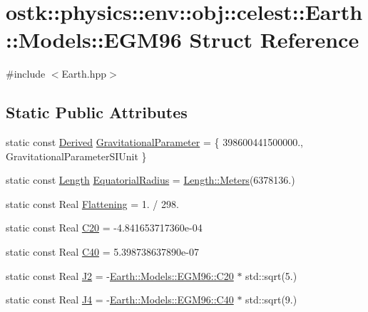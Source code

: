 \hypertarget{structostk_1_1physics_1_1env_1_1obj_1_1celest_1_1_earth_1_1_models_1_1_e_g_m96}{}\section{ostk\+:\+:physics\+:\+:env\+:\+:obj\+:\+:celest\+:\+:Earth\+:\+:Models\+:\+:E\+G\+M96 Struct Reference}
\label{structostk_1_1physics_1_1env_1_1obj_1_1celest_1_1_earth_1_1_models_1_1_e_g_m96}


{\ttfamily \#include $<$Earth.\+hpp$>$}

\subsection*{Static Public Attributes}
\begin{DoxyCompactItemize}
\item 
static const \hyperlink{classostk_1_1physics_1_1units_1_1_derived}{Derived} \hyperlink{structostk_1_1physics_1_1env_1_1obj_1_1celest_1_1_earth_1_1_models_1_1_e_g_m96_aa9bd99a13d1a3642806b5bb12238207e}{Gravitational\+Parameter} = \{ 398600441500000., Gravitational\+Parameter\+S\+I\+Unit \}
\item 
static const \hyperlink{classostk_1_1physics_1_1units_1_1_length}{Length} \hyperlink{structostk_1_1physics_1_1env_1_1obj_1_1celest_1_1_earth_1_1_models_1_1_e_g_m96_a6fd4657896411dfffa899b5d69c501c0}{Equatorial\+Radius} = \hyperlink{classostk_1_1physics_1_1units_1_1_length_ad227977ce00756791595796a0dd5ddd7}{Length\+::\+Meters}(6378136.)
\item 
static const Real \hyperlink{structostk_1_1physics_1_1env_1_1obj_1_1celest_1_1_earth_1_1_models_1_1_e_g_m96_a8e88f7d8d42fef033a94f610d6bb75f9}{Flattening} = 1. / 298.
\item 
static const Real \hyperlink{structostk_1_1physics_1_1env_1_1obj_1_1celest_1_1_earth_1_1_models_1_1_e_g_m96_a9ae4801d69fc8be4dcb24bc7496ff5b7}{C20} = -\/4.\+841653717360e-\/04
\item 
static const Real \hyperlink{structostk_1_1physics_1_1env_1_1obj_1_1celest_1_1_earth_1_1_models_1_1_e_g_m96_a0d1ffd77c12b97cfd85ce1b2970e5e1d}{C40} = 5.\+398738637890e-\/07
\item 
static const Real \hyperlink{structostk_1_1physics_1_1env_1_1obj_1_1celest_1_1_earth_1_1_models_1_1_e_g_m96_a304fd67c6142f1d6a0814647cbc90aad}{J2} = -\/\hyperlink{structostk_1_1physics_1_1env_1_1obj_1_1celest_1_1_earth_1_1_models_1_1_e_g_m96_a9ae4801d69fc8be4dcb24bc7496ff5b7}{Earth\+::\+Models\+::\+E\+G\+M96\+::\+C20} $\ast$ std\+::sqrt(5.)
\item 
static const Real \hyperlink{structostk_1_1physics_1_1env_1_1obj_1_1celest_1_1_earth_1_1_models_1_1_e_g_m96_a32895193b72cb896440cb4772c79ffbf}{J4} = -\/\hyperlink{structostk_1_1physics_1_1env_1_1obj_1_1celest_1_1_earth_1_1_models_1_1_e_g_m96_a0d1ffd77c12b97cfd85ce1b2970e5e1d}{Earth\+::\+Models\+::\+E\+G\+M96\+::\+C40} $\ast$ std\+::sqrt(9.)
\end{DoxyCompactItemize}


